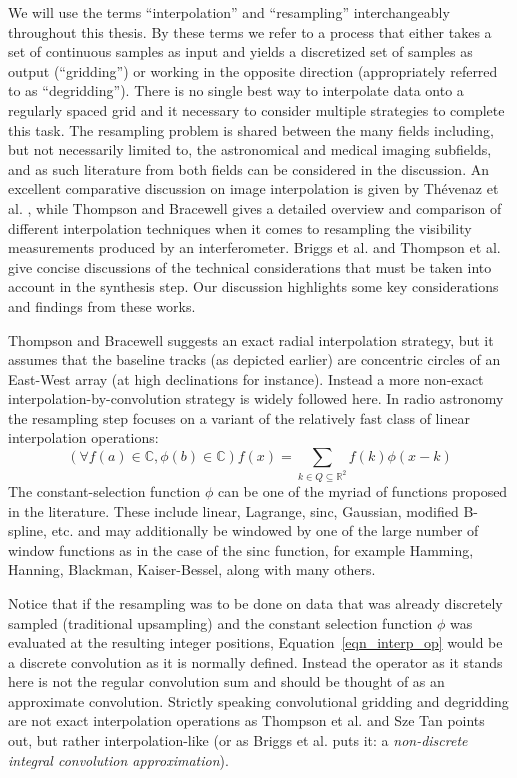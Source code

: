  We will use the terms ``interpolation'' and ``resampling'' interchangeably throughout this thesis. By these terms we refer to a process that 
 either takes a set of continuous samples as input and yields a discretized set of samples as output (``gridding'') or working in the opposite 
 direction (appropriately referred to as ``degridding''). There is no single best way to interpolate data onto a regularly spaced grid 
 and it necessary to consider multiple strategies to complete this task. The resampling problem is shared between the many fields including, 
 but not necessarily limited to, the astronomical and medical imaging subfields, and as such literature from both fields can be considered in 
 the discussion. An excellent comparative discussion on image interpolation is given by Th\'evenaz et al. \cite{thevenaz2000image}, while
 Thompson and Bracewell \cite{thompson1974interpolation} gives a detailed overview and comparison of different interpolation techniques when it comes to 
 resampling the visibility measurements produced by an interferometer. Briggs et al. \cite[Lecture 7]{taylor1999synthesis} and 
 Thompson et al. \cite[p. 387-399]{thompson2008interferometry} give concise discussions of the technical considerations that must be taken into 
 account in the synthesis step. Our discussion highlights some key considerations and findings from these works.
 
 Thompson and Bracewell \cite{thompson1974interpolation} suggests an exact radial interpolation strategy, but it assumes
 that the baseline tracks (as depicted earlier) are concentric circles of an East-West array (at high declinations for instance). Instead a 
 more non-exact interpolation-by-convolution strategy is widely followed here. In radio astronomy the resampling step focuses on a 
 variant of the relatively fast class of linear interpolation operations:
 \begin{equation}
   \label{eqn_interp_op}
   (\forall f(a)\in\mathbb{C},\phi(b)\in\mathbb{C})f(x) = \sum_{k\in Q\subseteq\mathbb{R}^2}{f(k)\phi(x-k)}
 \end{equation}
 The constant-selection function $\phi$ can be one of the myriad of functions proposed in the literature. These include linear, Lagrange, sinc, 
 Gaussian, modified B-spline, etc. and may additionally be windowed by one of the large number of window functions as in the case of the sinc function, 
 for example Hamming, Hanning, Blackman, Kaiser-Bessel, along with many others.
 
 Notice that if the resampling was to be done on data that was already discretely sampled (traditional upsampling) and the constant 
 selection function $\phi$ was evaluated at the resulting integer positions, Equation~\ref{eqn_interp_op} would be a discrete convolution as it is
 normally defined. Instead the operator as it stands here is not the regular convolution sum and should be thought of as an approximate convolution. 
 Strictly speaking convolutional gridding and degridding are not exact interpolation operations as Thompson et al. \cite{thompson2008interferometry} and 
 Sze Tan \cite{tan1986aperture} points out, but rather interpolation-like (or as Briggs et al. \cite[Lecture 7]{taylor1999synthesis} puts 
 it: a \emph{non-discrete integral convolution approximation}).
 
